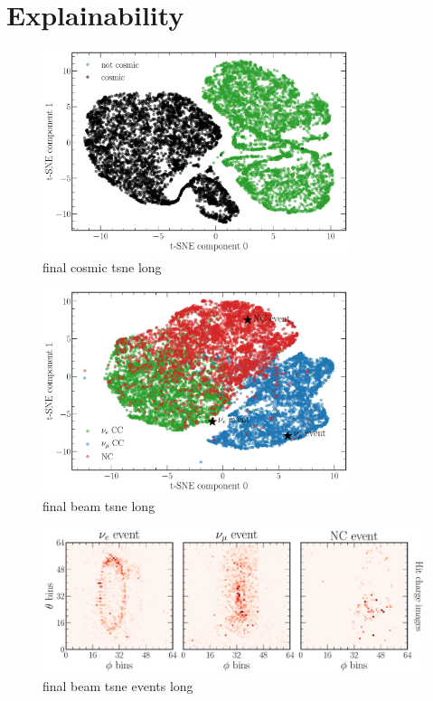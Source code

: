 \section{Explainability} %
\label{sec:cvn_explain} %

\begin{figure} %
    \includegraphics[width=0.8\textwidth]{diagrams/7-cvn/chipsnet/final_cosmic_tsne.pdf}
    \caption[final cosmic tsne short]
    {final cosmic tsne long}
    \label{fig:final_cosmic_tsne}
\end{figure}

\begin{figure} %
    \includegraphics[width=0.8\textwidth]{diagrams/7-cvn/chipsnet/final_beam_tsne.pdf}
    \caption[final beam tsne short]
    {final beam tsne long}
    \label{fig:final_beam_tsne}
\end{figure}

\begin{figure} %
    \includegraphics[width=\textwidth]{diagrams/7-cvn/chipsnet/final_beam_tsne_events.pdf}
    \caption[final beam tsne events short]
    {final beam tsne events long}
    \label{fig:final_beam_tsne_events}
\end{figure}

